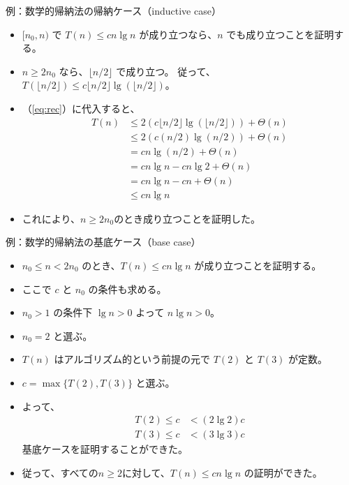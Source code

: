 \documentclass[unicode,11pt,aspectratio=169,notes]{beamer} %
\begin{document}
\begin{frame}{例：数学的帰納法の帰納ケース（inductive case）}
  \begin{itemize}
    \item<+-> $[n_0,n)$ で $T(n)\leq cn\lg n$ が成り立つなら、$n$
    でも成り立つことを証明する。
    \item<+-> $n\geq 2n_0$ なら、$\lfloor n/2\rfloor$ で成り立つ。
    従って、$T(\lfloor n/2\rfloor)\leq c\lfloor n/2\rfloor\lg(\lfloor n/2\rfloor)$。
    \item<+-> （\ref{eq:rec}）に代入すると、
    \begin{align*}
      T(n) & \leq 2(c\lfloor n/2\rfloor\lg(\lfloor n/2\rfloor)) + \Theta(n) \\
           & \leq 2(c(n/2)\lg(n/2)) + \Theta(n) \\
           & = cn\lg(n/2) + \Theta(n) \\
           & = cn\lg n - cn\lg 2 + \Theta(n) \\
           & = cn\lg n - cn + \Theta(n) \\
           & \leq cn\lg n
    \end{align*}
    \item<+-> これにより、$n\geq 2n_0$のとき成り立つことを証明した。
  \end{itemize}
\end{frame}


\begin{frame}{例：数学的帰納法の基底ケース（base case）}
  \begin{itemize}
    \item<+-> $n_0\leq n<2n_0$ のとき、$T(n)\leq cn\lg n$ が成り立つことを証明する。
    \item<+-> ここで $c$ と $n_0$ の条件も求める。
    \item<+-> $n_0>1$ の条件下 $\lg n>0$ よって $n\lg n>0$。
    \item<+-> $n_0=2$ と選ぶ。
    \item<+-> $T(n)$ はアルゴリズム的という前提の元で $T(2)$ と $T(3)$ が定数。
    \item<+-> $c=\max\{T(2), T(3)\}$ と選ぶ。
    \item<+-> よって、
    \begin{align*}
      T(2) \leq c & < (2\lg 2)c \\
      T(3) \leq c & < (3\lg 3)c
    \end{align*}
    基底ケースを証明することができた。
    \item<+-> 従って、すべての$n\geq 2$に対して、$T(n)\leq cn\lg n$ の証明ができた。
  \end{itemize}
\end{frame}
\end{document}

